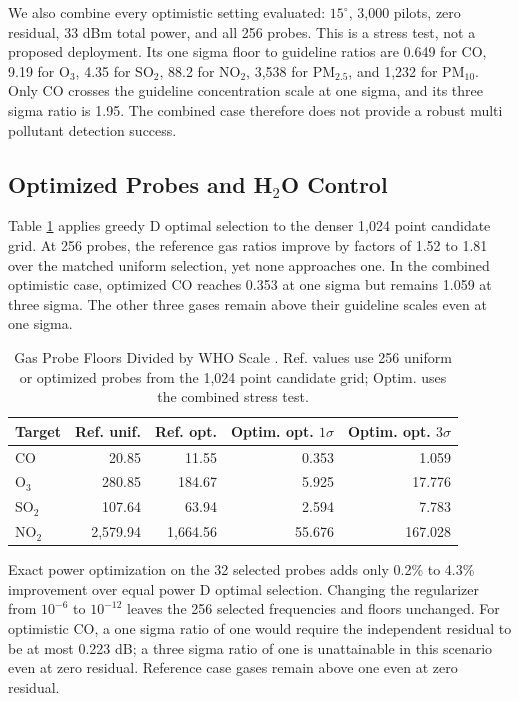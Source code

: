 \documentclass[conference]{IEEEtran}
\newcommand{\pmfive}{PM$_{2.5}$}
\newcommand{\pmten}{PM$_{10}$}
\begin{document}
We also combine every optimistic setting evaluated: $15^\circ$, 3,000 pilots, zero residual, 33 dBm total power, and all 256 probes. This is a stress test, not a proposed deployment. Its one sigma floor to guideline ratios are 0.649 for CO, 9.19 for O$_3$, 4.35 for SO$_2$, 88.2 for NO$_2$, 3,538 for \pmfive, and 1,232 for \pmten. Only CO crosses the guideline concentration scale at one sigma, and its three sigma ratio is 1.95. The combined case therefore does not provide a robust multi pollutant detection success.

\subsection{Optimized Probes and H$_2$O Control}

Table \ref{tab:optimized} applies greedy D optimal selection to the denser 1,024 point candidate grid. At 256 probes, the reference gas ratios improve by factors of 1.52 to 1.81 over the matched uniform selection, yet none approaches one. In the combined optimistic case, optimized CO reaches 0.353 at one sigma but remains 1.059 at three sigma. The other three gases remain above their guideline scales even at one sigma.

\begin{table}[t]
\caption{Gas Probe Floors Divided by WHO Scale \cite{who2021aqg}. Ref. values use 256 uniform or optimized probes from the 1,024 point candidate grid; Optim. uses the combined stress test.}
\label{tab:optimized}
\centering
\scriptsize
\setlength{\tabcolsep}{2.4pt}
\begin{tabular}{@{}lrrrr@{}}
\toprule
Target & Ref. unif. & Ref. opt. & Optim. opt. $1\sigma$ & Optim. opt. $3\sigma$ \\
\midrule
CO & 20.85 & 11.55 & 0.353 & 1.059 \\
O$_3$ & 280.85 & 184.67 & 5.925 & 17.776 \\
SO$_2$ & 107.64 & 63.94 & 2.594 & 7.783 \\
NO$_2$ & 2,579.94 & 1,664.56 & 55.676 & 167.028 \\
\bottomrule
\end{tabular}
\end{table}

Exact power optimization on the 32 selected probes adds only 0.2\% to 4.3\% improvement over equal power D optimal selection. Changing the regularizer from $10^{-6}$ to $10^{-12}$ leaves the 256 selected frequencies and floors unchanged. For optimistic CO, a one sigma ratio of one would require the independent residual to be at most 0.223 dB; a three sigma ratio of one is unattainable in this scenario even at zero residual. Reference case gases remain above one even at zero residual.
\end{document}
